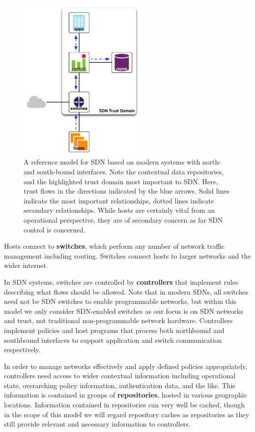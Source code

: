 \documentclass[10pt,conference]{IEEEtran}
\begin{document}
\begin{figure}[!t]
\centering
\includegraphics[width=2.5in]{images/reference-model.pdf}
\caption{A reference model for SDN based on modern systems with north- and south-bound interfaces.  Note the contextual data repositories, and the highlighted trust domain most important to SDN.  Here, trust flows in the directions indicated by the blue arrows.  Solid lines indicate the most important relationships, dotted lines indicate secondary relationships.  While hosts are certainly vital from an operational perspective, they are of secondary concern as far SDN control is concerned.}
\label{fig:reference-model}
\end{figure}

Hosts connect to {\bf switches}, which perform any number of network traffic management including routing.  Switches connect hosts to larger networks and the wider internet.  

In SDN systems, switches are controlled by {\bf controllers} that implement rules describing what flows should be allowed.  Note that in modern SDNs, all switches need not be SDN switches to enable programmable networks, but within this model we only consider SDN-enabled switches as our focus is on SDN networks and trust, not traditional non-programmable network hardware.  Controllers implement policies and host programs that process both northbound and southbound interfaces to support application and switch communication respectively.  

In order to manage networks effectively and apply defined policies appropriately, controllers need access to wider contextual information including operational state, overarching policy information, authentication data, and the like.  This information is contained in groups of {\bf repositories}, hosted in various geographic locations.  Information contained in repositories can very well be cached, though in the scope of this model we will regard repository caches as repositories as they still provide relevant and necessary information to controllers.  
\end{document}
